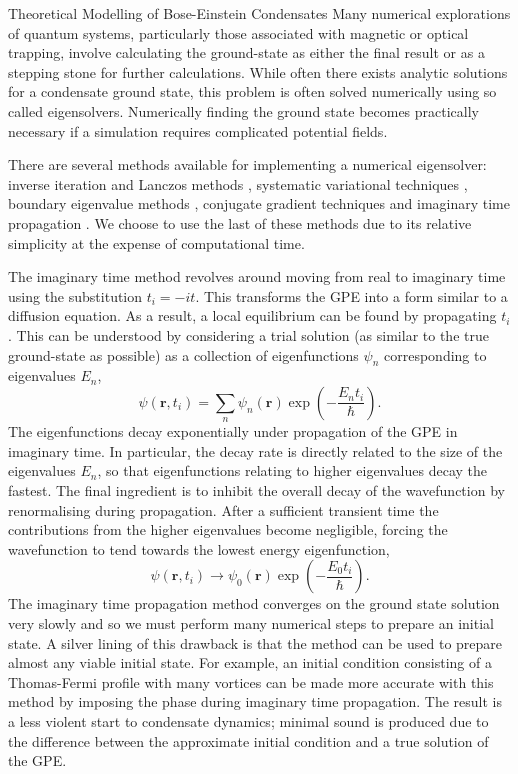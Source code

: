 \begin{chapter}{\label{cha:theoretical_model}Theoretical Modelling of Bose-Einstein Condensates}
	Many numerical explorations of quantum systems, particularly those associated with magnetic or optical trapping,  involve calculating the ground-state as either the final result or as a stepping stone for further calculations. While often there exists analytic solutions for a condensate ground state, this problem is often solved numerically using so called eigensolvers. Numerically finding the ground state becomes practically necessary if a simulation requires complicated potential fields.

	There are several methods available for implementing a numerical eigensolver: inverse iteration and Lanczos methods \cite{thijssen1999computational}, systematic variational techniques \cite{Bao2003230}, boundary eigenvalue methods \cite{Edwards95}, conjugate gradient techniques \cite{NumericalRecipes} and imaginary time propagation \cite{PhysRevE.62.7438}. We choose to use the last of these methods due to its relative simplicity at the expense of computational time.

	The imaginary time method revolves around moving from real to imaginary time using the substitution $t_i = -it$. This transforms the GPE into a form similar to a diffusion equation. As a result, a local equilibrium can be found by propagating $t_i$. This can be understood by considering a trial solution (as similar to the true ground-state as possible) as a collection of eigenfunctions $\psi_n$ corresponding to eigenvalues $E_n$,
\begin{equation*}
\psi(\mathbf{r},t_i) = \sum_n \psi_n(\mathbf{r})\exp\left(-\frac{E_nt_i}{\hbar}\right).
\end{equation*}
The eigenfunctions decay exponentially under propagation of the GPE in imaginary time. In particular, the decay rate is directly related to the size of the eigenvalues $E_n$, so that eigenfunctions relating to higher eigenvalues decay the fastest. The final ingredient is to inhibit the overall decay of the wavefunction by renormalising during propagation. After a sufficient transient time the contributions from the higher eigenvalues become negligible, forcing the wavefunction to tend towards the lowest energy eigenfunction,
\begin{equation*}
\psi(\mathbf{r},t_i) \rightarrow \psi_0(\mathbf{r})\exp\left(-\frac{E_0t_i}{\hbar}\right).
\end{equation*}
The imaginary time propagation method converges on the ground state solution very slowly and so we must perform many numerical steps to prepare an initial state. A silver lining of this drawback is that the method can be used to prepare almost any viable initial state. For example, an initial condition consisting of a Thomas-Fermi profile with many vortices can be made more accurate with this method by imposing the phase during imaginary time propagation. The result is a less violent start to condensate dynamics; minimal sound is produced due to the difference between the approximate initial condition and a true solution of the GPE.


\end{chapter}
